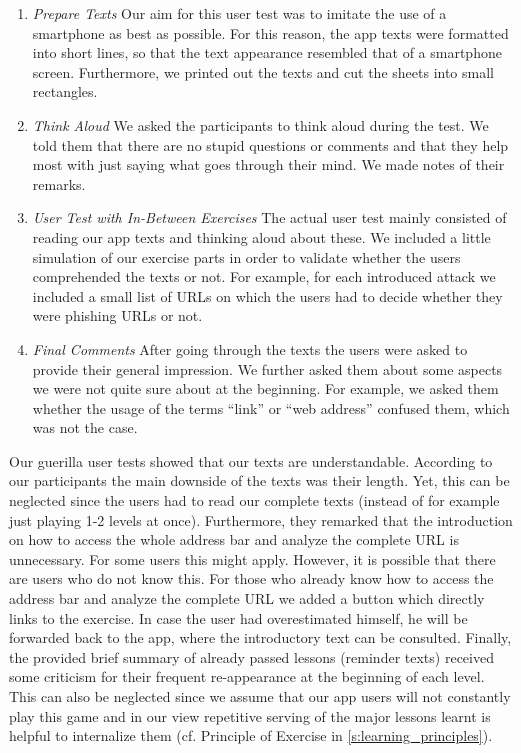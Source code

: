 \begin{enumerate}
	\item\textit{Prepare Texts} Our aim for this user test was to imitate the use of a smartphone as best as possible.
	For this reason, the app texts were formatted into short lines, so that the text appearance resembled that of a smartphone screen.
	Furthermore, we printed out the texts and cut the sheets into small rectangles.
	\item\textit{Think Aloud} We asked the participants to think aloud during the test. 
	We told them that there are no stupid questions or comments and that they help most with just saying what goes through their mind.
	We made notes of their remarks.
	\item\textit{User Test with In-Between Exercises} The actual user test mainly consisted of reading our app texts and thinking aloud about these.
	We included a little simulation of our exercise parts in order to validate whether the users comprehended the texts or not.
	For example, for each introduced attack we included a small list of URLs on which the users had to decide whether they were phishing URLs or not.
	\item\textit{Final Comments} After going through the texts the users were asked to provide their general impression.
	We further asked them about some aspects we were not quite sure about at the beginning. 
	For example, we asked them whether the usage of the terms ``link'' or ``web address'' confused them, which was not the case.
\end{enumerate}
Our guerilla user tests showed that our texts are understandable.
According to our participants the main downside of the texts was their length. 
Yet, this can be neglected since the users had to read our complete texts (instead of for example just playing 1-2 levels at once). 
Furthermore, they remarked that the introduction on how to access the whole address bar and analyze the complete URL is unnecessary. 
For some users this might apply. 
However, it is possible that there are users who do not know this. 
For those who already know how to access the address bar and analyze the complete URL we added a button which directly links to the exercise. 
In case the user had overestimated himself, he will be forwarded back to the app, where the introductory text can be consulted. 
Finally, the provided brief summary of already passed lessons (reminder texts) received some criticism for their frequent re-appearance at the beginning of each level. 
This can also be neglected since we assume that our app users will not constantly play this game and in our view repetitive serving of the major lessons learnt is helpful to internalize them (cf. Principle of Exercise in \autoref{s:learning_principles}). 

